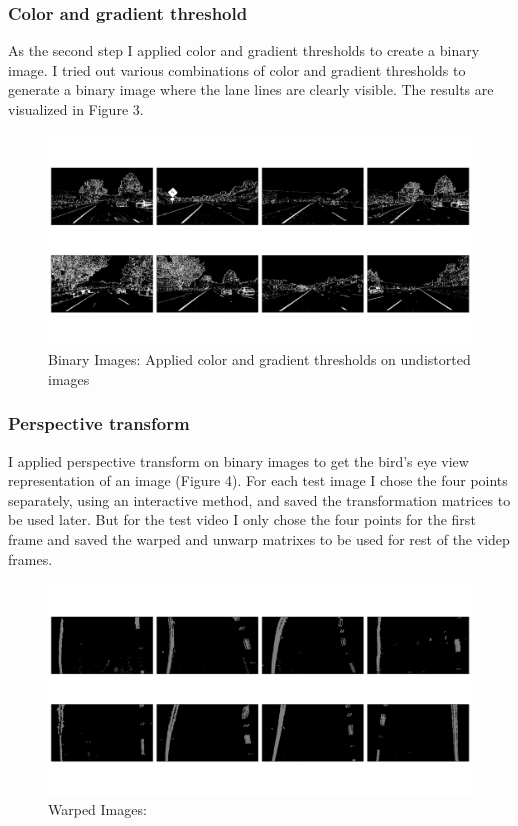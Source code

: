 \documentclass[12pt,a4paper,onecolumn]{report}
\begin{document}
\subsubsection*{Color and gradient threshold}

As the second step I applied color and gradient thresholds to create a binary image. I tried out various combinations of color and gradient thresholds to generate a binary image where the lane lines are clearly visible. The results are visualized in Figure 3.

\begin{figure}[H]
\centering
\includegraphics[width=\textwidth]{output_images/grid_images/grid_binary_image.jpg}
\caption{Binary Images: Applied color and gradient thresholds on undistorted images}
\end{figure}


\subsubsection*{Perspective transform}
I applied perspective transform on binary images to get the bird's eye view representation of an image (Figure 4). For each test image I chose the four points separately, using an interactive method, and saved the transformation matrices to be used later. But for the test video I only chose the four points for the first frame and saved the warped and unwarp matrixes to be used for rest of the videp frames.  

\begin{figure}[H]
\centering
\includegraphics[width=\textwidth]{output_images/grid_images/grid_binary_warped_image.jpg}
\caption{Warped Images: }
\end{figure}
\end{document}
